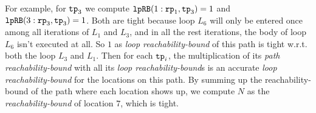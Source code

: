 For example, for $\mathtt{tp}_3$ we compute
$\mathtt{lpRB}(1: \mathtt{rp}_1, \mathtt{tp}_3) = 1$ and
$\mathtt{lpRB}(3: \mathtt{rp}_3, \mathtt{tp}_3) = 1$.
Both are tight because loop $L_6$ will only be entered once among all iterations of $L_1$ and $L_3$, and in all the rest iterations, the body of loop $L_6$ isn't executed at all.
So $1$ as \emph{loop reachability-bound} of this path is tight w.r.t. both the loop $L_3$ and $L_1$.
Then for each $\mathtt{tp}_i$, the multiplication of its \emph{path reachability-bound} with all its \emph{loop reachability-bound}s is an accurate \emph{loop reachability-bound} for the locations on this path.
By summing up the reachability-bound of the path where each location shows up,
we compute $N$ as the \emph{reachability-bound} of location $7$, which is tight.

